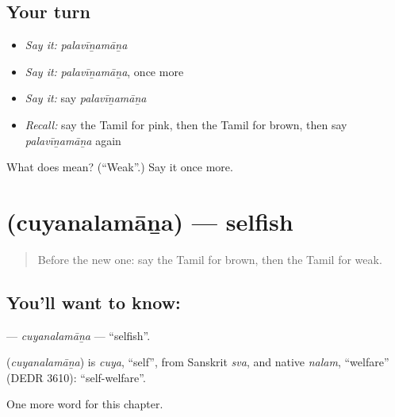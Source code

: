 \subsection*{Your turn}
\begin{itemize}
\raggedright
  \item \emph{Say it:} \emph{palavīṉamāṉa}
  \item \emph{Say it:} \emph{palavīṉamāṉa}, once more
  \item \emph{Say it:} say \emph{palavīṉamāṉa}
  \item \emph{Recall:} say the Tamil for pink, then the Tamil for brown, then say \emph{palavīṉamāṉa} again
\end{itemize}

\begin{tcolorbox}[breakable,colback=teal!4,colframe=teal!35!black,title={Before you move on}]
What does  mean? (\textquotedblleft{}Weak\textquotedblright{}.) Say it once more.
\end{tcolorbox}
\section[\texorpdfstring{\ta{சுயநலமான} (cuyanalamāṉa)}{சுயநலமான (cuyanalamāṉa)}]{ (cuyanalamāṉa) — selfish}

\label{lesson:TA-C212-cuyanalamana}



\begin{quote}
Before the new one: say the Tamil for brown, then the Tamil for weak.
\end{quote}

\subsection*{You'll want to know: }
\textbf{} — \emph{cuyanalamāṉa} — \textquotedblleft{}selfish\textquotedblright{}.

\begin{cousinweb}
\textbf{} (\emph{cuyanalamāṉa}) is \emph{cuya}, \textquotedblleft{}self\textquotedblright{}, from Sanskrit \emph{sva}, and native \emph{nalam}, \textquotedblleft{}welfare\textquotedblright{} (DEDR 3610): \textquotedblleft{}self-welfare\textquotedblright{}.
\end{cousinweb}

\begin{grammarlens}[title={What you've built}]
One more word for this chapter.
\end{grammarlens}

